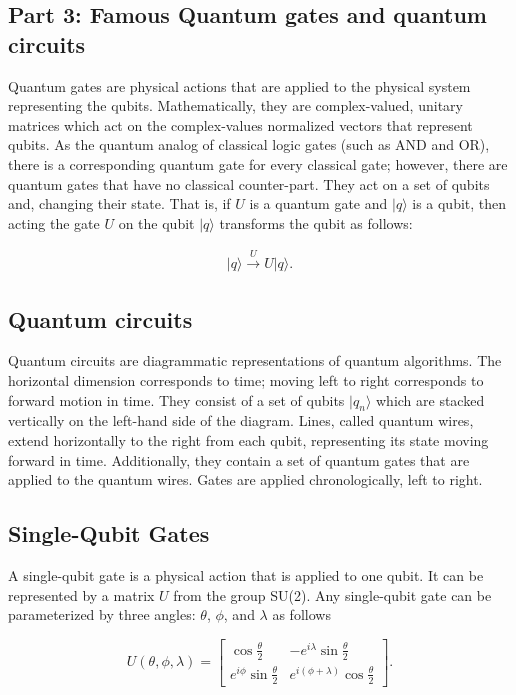 \documentclass[%
oneside,                 %
final,                   %
10pt]{article}
\begin{document}
\subsection{Part 3: Famous Quantum gates and quantum circuits}

Quantum gates are physical actions that are applied to the physical
system representing the qubits. Mathematically, they are
complex-valued, unitary matrices which act on the complex-values
normalized vectors that represent qubits. As the quantum analog of
classical logic gates (such as AND and OR), there is a corresponding
quantum gate for every classical gate; however, there are quantum
gates that have no classical counter-part. They act on a set of qubits
and, changing their state. That is, if $U$ is a quantum gate and
$\vert q \rangle $ is a qubit, then acting the gate $U$ on the qubit $\vert q \rangle $
transforms the qubit as follows:

\begin{align}
\vert q \rangle \overset{U}{\to}U\vert q \rangle 
.\end{align}

\subsection{Quantum circuits}

Quantum circuits are diagrammatic representations of quantum
algorithms. The horizontal dimension corresponds to time; moving left
to right corresponds to forward motion in time. They consist of a set
of qubits $\vert q_n\rangle$ which are stacked vertically on the left-hand
side of the diagram. Lines, called quantum wires, extend horizontally
to the right from each qubit, representing its state moving forward in
time. Additionally, they contain a set of quantum gates that are
applied to the quantum wires. Gates are applied chronologically, left
to right.

\subsection{Single-Qubit Gates}

A single-qubit gate is a physical action that is applied to one
qubit. It can be represented by a matrix $U$ from the group SU(2). Any
single-qubit gate can be parameterized by three angles: $\theta$,
$\phi$, and $\lambda$ as follows

\[
U(\theta,\phi,\lambda)=\begin{bmatrix}
\cos\frac{\theta}{2} & -e^{i\lambda}\sin\frac{\theta}{2}
\\
e^{i\phi}\sin\frac{\theta}{2} & e^{i(\phi+\lambda)}\cos\frac{\theta}{2}
\end{bmatrix}.
\]
\end{document}
